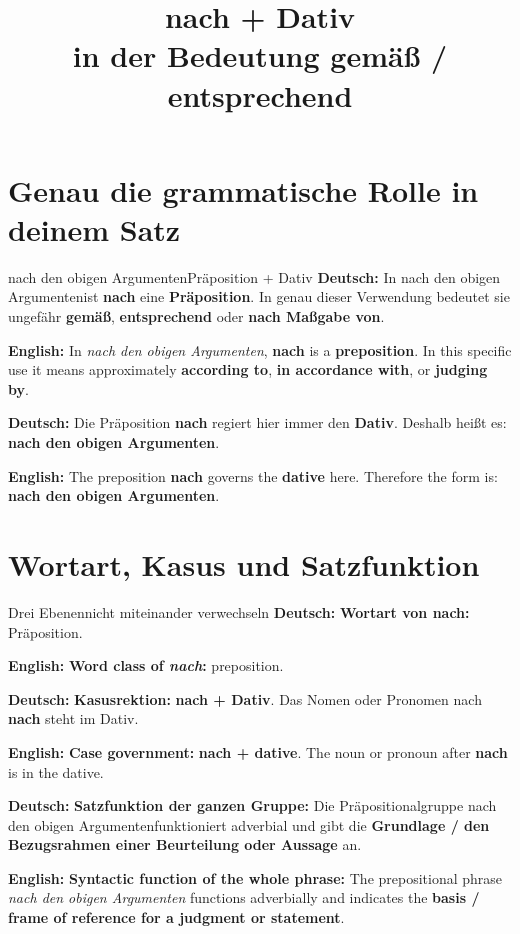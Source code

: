 \documentclass[a4paper,11pt]{article}
\title{\glqq nach + Dativ\grqq\\in der Bedeutung \glqq gemäß / entsprechend\grqq}
\date{}
\newcommand{\GermanText}[1]{\textbf{Deutsch: }#1\par}
\newcommand{\EnglishText}[1]{{\small\color{SoftGray}\textbf{English: }#1\par}}
\begin{document}
\maketitle
\tableofcontents
\newpage

\section{Genau die grammatische Rolle in deinem Satz}

\begin{grammarentry}{nach den obigen Argumenten}{Präposition + Dativ}
\GermanText{In \glqq nach den obigen Argumenten\grqq ist \textbf{nach} eine \textbf{Präposition}. In genau dieser Verwendung bedeutet sie ungefähr \textbf{gemäß}, \textbf{entsprechend} oder \textbf{nach Maßgabe von}.}
\EnglishText{In \textit{nach den obigen Argumenten}, \textbf{nach} is a \textbf{preposition}. In this specific use it means approximately \textbf{according to}, \textbf{in accordance with}, or \textbf{judging by}.}

\GermanText{Die Präposition \textbf{nach} regiert hier immer den \textbf{Dativ}. Deshalb heißt es: \textbf{nach den obigen Argumenten}.}
\EnglishText{The preposition \textbf{nach} governs the \textbf{dative} here. Therefore the form is: \textbf{nach den obigen Argumenten}.}
\end{grammarentry}

\section{Wortart, Kasus und Satzfunktion}

\begin{grammarentry}{Drei Ebenen}{nicht miteinander verwechseln}
\GermanText{\textbf{Wortart von \glqq nach\grqq:} Präposition.}
\EnglishText{\textbf{Word class of \textit{nach}:} preposition.}

\GermanText{\textbf{Kasusrektion:} \textbf{nach + Dativ}. Das Nomen oder Pronomen nach \textbf{nach} steht im Dativ.}
\EnglishText{\textbf{Case government:} \textbf{nach + dative}. The noun or pronoun after \textbf{nach} is in the dative.}

\GermanText{\textbf{Satzfunktion der ganzen Gruppe:} Die Präpositionalgruppe \glqq nach den obigen Argumenten\grqq funktioniert adverbial und gibt die \textbf{Grundlage / den Bezugsrahmen einer Beurteilung oder Aussage} an.}
\EnglishText{\textbf{Syntactic function of the whole phrase:} The prepositional phrase \textit{nach den obigen Argumenten} functions adverbially and indicates the \textbf{basis / frame of reference for a judgment or statement}.}
\end{grammarentry}
\end{document}
